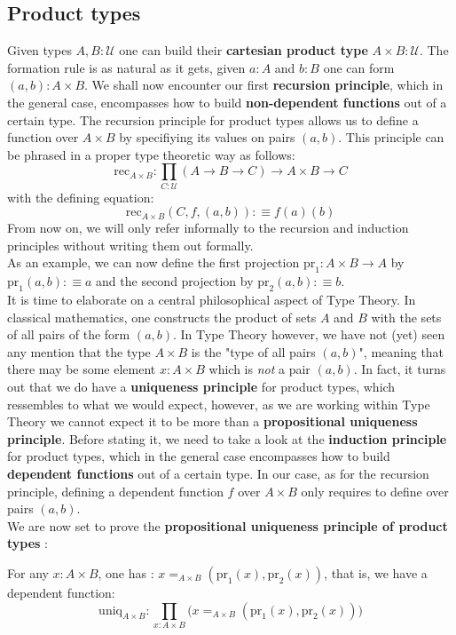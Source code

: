 \documentclass{report}
\begin{document}
\subsection{Product types}
Given types $A,B : \mathcal{U}$ one can build their \textbf{cartesian product type} $A \times B : \mathcal{U}$. The formation rule is as natural as it gets, given $a : A$ and $b : B$ one can form $(a,b) : A \times B$. We shall now encounter our first \textbf{recursion principle}, which in the general case, encompasses how to build \textbf{non-dependent functions} out of a certain type. The recursion principle for product types allows us to define a function over $A\times B$ by specifiying its values on pairs $(a,b)$. This principle can be phrased in a proper type theoretic way as follows:
$$\mathrm{rec}_{A\times B} : \prod_{C : \mathcal{U}} (A \rightarrow B \rightarrow C) \rightarrow A\times B \rightarrow C$$
with the defining equation:
$$\mathrm{rec}_{A\times B}(C,f,(a,b)) :\equiv f(a)(b)$$ 
From now on, we will only refer informally to the recursion and induction principles without writing them out formally.\\
As an example, we can now define the first projection $\mathrm{pr}_1 : A\times B \rightarrow A$ by $\mathrm{pr}_1(a,b) :\equiv a$ and the second projection by $\mathrm{pr}_2 (a,b) :\equiv b$.\\ 
It is time to elaborate on a central philosophical aspect of Type Theory. In classical mathematics, one constructs the product of sets $A$ and $B$ with the sets of all pairs of the form $(a,b)$. In Type Theory however, we have not (yet) seen any mention that the type $A\times B$ is the "type of all pairs $(a,b)$", meaning that there may be some element $x : A \times B$ which is \textit{not} a pair $(a,b)$. In fact, it turns out that we do have a \textbf{uniqueness principle} for product types, which ressembles to what we would expect, however, as we are working within Type Theory we cannot expect it to be more than a \textbf{propositional uniqueness principle}. Before stating it, we need to take a look at the \textbf{induction principle} for product types, which in the general case encompasses how to build \textbf{dependent functions} out of a certain type. In our case, as for the recursion principle, defining a dependent function $f$ over $A \times B$ only requires to define over pairs $(a,b)$.\\
We are now set to prove the \textbf{propositional uniqueness principle of product types} :
\begin{prop}
  For any $x : A \times B$, one has : $x =_{A \times B} (\mathrm{pr}_1(x),\mathrm{pr}_2(x))$, that is, we have a dependent function:
  $$\mathrm{uniq}_{A\times B} : \prod_{x : A \times B} \big(x =_{A \times B} (\mathrm{pr}_1(x),\mathrm{pr}_2(x))\big)$$
\end{prop}
\end{document}
